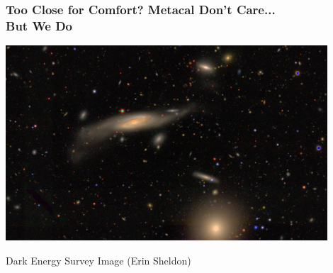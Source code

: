 \documentclass{beamer}
\begin{document}
\frame
{
    \frametitle{Too Close for Comfort?  Metacal Don't Care... \\But We Do}
 
    \begin{center}
        \includegraphics[width=0.9\textwidth]{DES0056-5248_gri_crop.jpg}
    \end{center}
    {\footnotesize Dark Energy Survey Image (Erin Sheldon)}

}
\end{document}
